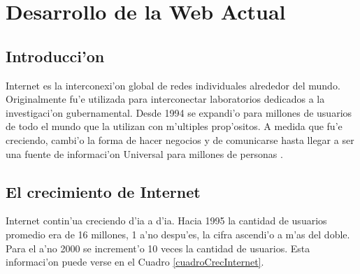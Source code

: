 \chapter{Desarrollo de la Web Actual}
\label{desarrolloWeb}
\section{Introducci'on}

Internet es la interconexi'on global de redes individuales alrededor del mundo. Originalmente fu'e utilizada para interconectar laboratorios dedicados a la investigaci'on gubernamental. Desde 1994 se expandi'o para millones de usuarios de todo el mundo que la utilizan con m'ultiples prop'ositos. A medida que fu'e creciendo, cambi'o la forma de hacer negocios y de comunicarse hasta llegar a ser una fuente de informaci'on Universal para millones de personas \citep{iws}.

\section{El crecimiento de Internet}

Internet contin'ua creciendo d'ia a d'ia. Hacia 1995 la cantidad de usuarios promedio era de 16 millones, 1 a'no despu'es, la cifra ascendi'o a m'as del doble. Para el a'no 2000 se increment'o 10 veces la cantidad de usuarios. Esta informaci'on puede verse en el Cuadro \ref{cuadroCrecInternet}.

